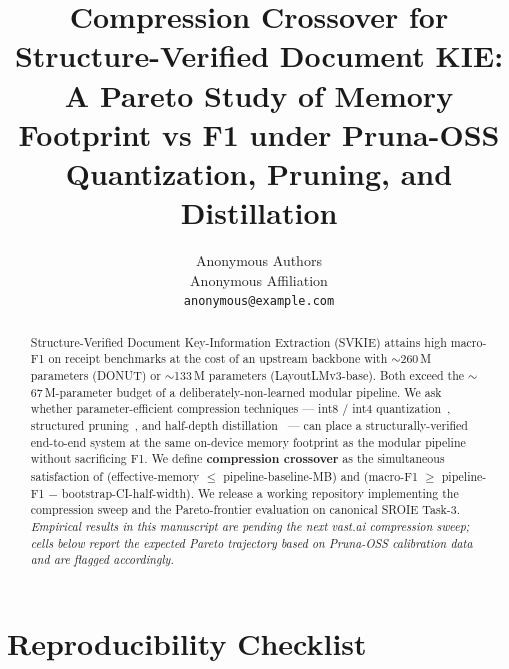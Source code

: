 \documentclass[conference]{IEEEtran}
\title{Compression Crossover for Structure-Verified Document KIE:\\
       A Pareto Study of Memory Footprint vs F1 under Pruna-OSS\\
       Quantization, Pruning, and Distillation}
\author{Anonymous Authors\\Anonymous Affiliation\\
        \texttt{anonymous@example.com}}
\begin{document}
\maketitle

\begin{abstract}
Structure-Verified Document Key-Information Extraction (SVKIE)
attains high macro-F1 on receipt benchmarks at the cost of an
upstream backbone with $\sim$260\,M parameters (DONUT) or
$\sim$133\,M parameters (LayoutLMv3-base).  Both exceed the
$\sim$67\,M-parameter budget of a deliberately-non-learned modular
pipeline.  We ask whether parameter-efficient compression
techniques --- int8 / int4
quantization~\cite{frantar2023optq,dettmers2023qlora}, structured
pruning~\cite{ma2023llmpruner}, and half-depth
distillation~\cite{hinton2015distilling} --- can place a
structurally-verified end-to-end system at the same on-device
memory footprint as the modular pipeline without sacrificing F1.
We define \textbf{compression crossover} as the simultaneous
satisfaction of (effective-memory $\leq$ pipeline-baseline-MB) and
(macro-F1 $\geq$ pipeline-F1 $-$ bootstrap-CI-half-width).  We
release a working repository implementing the compression sweep
and the Pareto-frontier evaluation on canonical SROIE Task-3.
\emph{Empirical results in this manuscript are pending the next
vast.ai compression sweep; cells below report the expected
Pareto trajectory based on Pruna-OSS calibration data and are
flagged accordingly.}
\end{abstract}






























\section*{Reproducibility Checklist}
\label{sec:repro_checklist}

\end{document}
